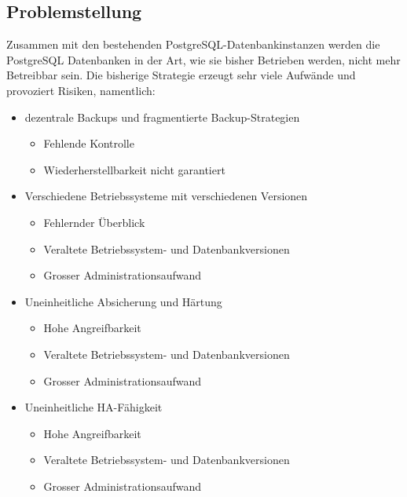 \subsection{Problemstellung}
Zusammen mit den bestehenden \Gls{PostgreSQL}-Datenbankinstanzen werden die \Gls{PostgreSQL} Datenbanken in der Art, wie sie bisher Betrieben werden, nicht mehr Betreibbar sein.
Die bisherige Strategie erzeugt sehr viele Aufwände und provoziert Risiken, namentlich:
\begin{itemize}
    \item dezentrale Backups und fragmentierte Backup-Strategien
    \begin{itemize}
        \item Fehlende Kontrolle
        \item Wiederherstellbarkeit nicht garantiert
    \end{itemize}
    \item Verschiedene Betriebssysteme mit verschiedenen Versionen
    \begin{itemize}
        \item Fehlernder Überblick
        \item Veraltete Betriebssystem- und Datenbankversionen
        \item Grosser Administrationsaufwand
    \end{itemize}
    \item Uneinheitliche Absicherung und Härtung
    \begin{itemize}
        \item Hohe Angreifbarkeit
        \item Veraltete Betriebssystem- und Datenbankversionen
        \item Grosser Administrationsaufwand
    \end{itemize}
    \item Uneinheitliche HA-Fähigkeit
    \begin{itemize}
        \item Hohe Angreifbarkeit
        \item Veraltete Betriebssystem- und Datenbankversionen
        \item Grosser Administrationsaufwand
    \end{itemize}
\end{itemize}

